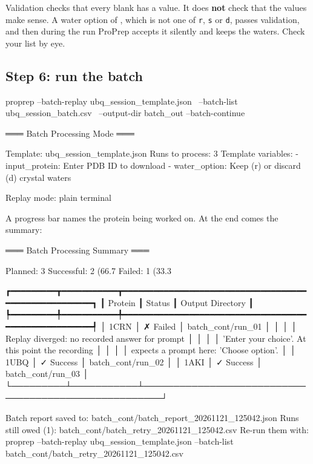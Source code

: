 \begin{watchout}
Validation checks that every blank has a value. It does \textbf{not} check
that the values make sense. A water option of , which is not one of
\texttt{r}, \texttt{s} or \texttt{d}, passes validation, and then during the
run ProPrep accepts it silently and keeps the waters. Check your list by eye.
\end{watchout}

\subsection{Step 6: run the batch}

\begin{terminal}
proprep --batch-replay ubq_session_template.json \
        --batch-list ubq_session_batch.csv \
        --output-dir batch_out --batch-continue
\end{terminal}

\begin{screen}
═══ Batch Processing Mode ═══

Template: ubq_session_template.json
Runs to process: 3
Template variables:
  - input_protein: Enter PDB ID to download
  - water_option: Keep (r) or discard (d) crystal waters

Replay mode: plain terminal
\end{screen}

A progress bar names the protein being worked on. At the end comes the
summary:

\begin{screen}
═══ Batch Processing Summary ═══

Planned: 3
Successful: 2 (66.7%
Failed: 1 (33.3%

┏━━━━━━━━━┳━━━━━━━━━━━┳━━━━━━━━━━━━━━━━━━━━━━━━━━━━━━━━━━━━━━━━━━━━━━━━━━━━━┓
┃ Protein ┃ Status    ┃ Output Directory                                    ┃
┡━━━━━━━━━╇━━━━━━━━━━━╇━━━━━━━━━━━━━━━━━━━━━━━━━━━━━━━━━━━━━━━━━━━━━━━━━━━━━┩
│ 1CRN    │ ✗ Failed  │ batch_cont/run_01                                   │
│         │           │ Replay diverged: no recorded answer for prompt      │
│         │           │ 'Enter your choice'. At this point the recording    │
│         │           │ expects a prompt here: 'Choose option'.             │
│ 1UBQ    │ ✓ Success │ batch_cont/run_02                                   │
│ 1AKI    │ ✓ Success │ batch_cont/run_03                                   │
└─────────┴───────────┴─────────────────────────────────────────────────────┘

Batch report saved to: batch_cont/batch_report_20261121_125042.json
Runs still owed (1): batch_cont/batch_retry_20261121_125042.csv
Re-run them with: proprep --batch-replay ubq_session_template.json
--batch-list batch_cont/batch_retry_20261121_125042.csv
\end{screen}

